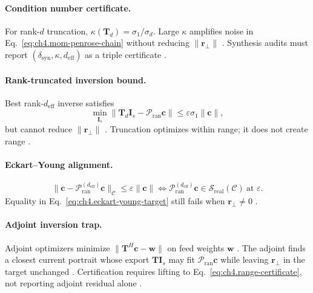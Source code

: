 \paragraph{Condition number certificate.}
For rank-\(d\) truncation, \(\kappa(\mathbf{T}_{d})=\sigma_{1}/\sigma_{d}\). Large \(\kappa\) amplifies noise in Eq.~\eqref{eq:ch4.mom-penrose-chain}
without reducing \(\|\mathbf{r}_{\perp}\|\) \cite{hansen1988,harrington2001}. Synthesis audits must report \((\delta_{\mathrm{syn}},\kappa,d_{\mathrm{eff}})\)
as a triple certificate \cite{stratton1941,devaney2004}.

\paragraph{Rank-truncated inversion bound.}
Best rank-\(d_{\mathrm{eff}}\) inverse satisfies
\begin{equation}
\label{eq:ch4.rank-truncated-inverse}
\min_{\mathbf{I}_{s}}\|\mathbf{T}_{d}\mathbf{I}_{s}-\mathcal{P}_{\mathrm{ran}}\mathbf{c}\|
\le
\varepsilon\sigma_{1}\|\mathbf{c}\|,
\end{equation}
but cannot reduce \(\|\mathbf{r}_{\perp}\|\) \cite{harrington2001,hansen1988,stratton1941}. Truncation optimizes within range; it does not create range
\cite{devaney2004}.

\paragraph{Eckart--Young alignment.}
\begin{equation}
\label{eq:ch4.eckart-young-target}
\|\mathbf{c}-\mathcal{P}_{\mathrm{ran}}^{(d_{\mathrm{eff}})}\mathbf{c}\|_{\mathcal{C}}\le\varepsilon\|\mathbf{c}\|
\iff
\mathcal{P}_{\mathrm{ran}}^{(d_{\mathrm{eff}})}\mathbf{c}\in\mathcal{S}_{\mathrm{real}}(\mathcal{C})\ \text{at }\varepsilon.
\end{equation}
Equality in Eq.~\eqref{eq:ch4.eckart-young-target} still fails when \(\mathbf{r}_{\perp}\neq0\) \cite{harrington2001,stratton1941}.

\paragraph{Adjoint inversion trap.}
Adjoint optimizers minimize \(\|\mathbf{T}^{H}\mathbf{c}-\mathbf{w}\|\) on feed weights \(\mathbf{w}\) \cite{harrington2001,devaney2004}. The adjoint
finds a closest current portrait whose export \(\mathbf{T}\mathbf{I}_{s}\) may fit \(\mathcal{P}_{\mathrm{ran}}\mathbf{c}\) while leaving
\(\mathbf{r}_{\perp}\) in the target unchanged \cite{stratton1941,hansen1988}. Certification requires lifting to Eq.~\eqref{eq:ch4.range-certificate},
not reporting adjoint residual alone \cite{harrington2001}.

